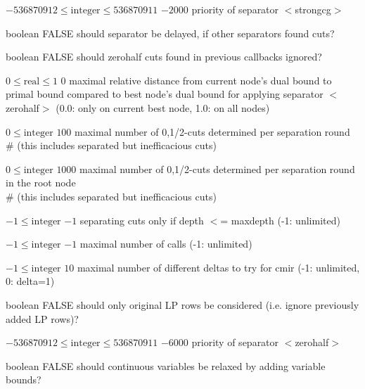 %
{$-536870912\leq\textrm{integer}\leq536870911$}%
{$-2000$}%
{priority of separator $<$strongcg$>$}%
{}

%
{boolean}%
{FALSE}%
{should separator be delayed, if other separators found cuts?}%
{}

%
{boolean}%
{FALSE}%
{should zerohalf cuts found in previous callbacks ignored?}%
{}

%
{$0\leq\textrm{real}\leq1$}%
{$0$}%
{maximal relative distance from current node's dual bound to primal bound compared to best node's dual bound for applying separator $<$zerohalf$>$ (0.0: only on current best node, 1.0: on all nodes)}%
{}

%
{$0\leq\textrm{integer}$}%
{$100$}%
{maximal number of {0,1/2}-cuts determined per separation round\\   \#                      (this includes separated but inefficacious cuts)}%
{}

%
{$0\leq\textrm{integer}$}%
{$1000$}%
{maximal number of {0,1/2}-cuts determined per separation round in the root node\\   \#                      (this includes separated but inefficacious cuts)}%
{}

%
{$-1\leq\textrm{integer}$}%
{$-1$}%
{separating cuts only if depth $<$= maxdepth (-1: unlimited)}%
{}

%
{$-1\leq\textrm{integer}$}%
{$-1$}%
{maximal number of calls (-1: unlimited)}%
{}

%
{$-1\leq\textrm{integer}$}%
{$10$}%
{maximal number of different deltas to try for cmir (-1: unlimited, 0: delta=1)}%
{}

%
{boolean}%
{FALSE}%
{should only original LP rows be considered (i.e. ignore previously added LP rows)?}%
{}

%
{$-536870912\leq\textrm{integer}\leq536870911$}%
{$-6000$}%
{priority of separator $<$zerohalf$>$}%
{}

%
{boolean}%
{FALSE}%
{should continuous variables be relaxed by adding variable bounds?}%
{}

